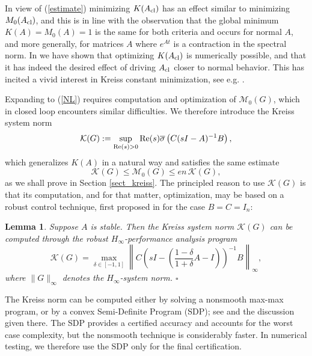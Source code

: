 \documentclass[12pt, a4paper,reqno]{amsart}
\newtheorem{lemma}{\bf Lemma}
\theoremstyle{definition}
\begin{document}
In view of (\ref{estimate}) minimizing $K(A_{\rm cl})$ has an  effect similar to minimizing $M_0(A_{\rm cl})$, and this is in line with the observation
that the global minimum $K(A)=M_0(A)=1$  is the same for both criteria and occurs for normal $A$, 
and more generally, for matrices $A$ where $e^{At}$ is a
contraction in the spectral norm. In \cite{an_kreiss} we have shown that optimizing $K(A_{\rm cl})$ is numerically possible, and that
it has indeed the desired effect of driving $A_{\rm cl}$ closer to normal behavior.
This has incited a vivid interest in Kreiss constant minimization, see e.g.
\cite{Krakovska2024Resilience,LeeMarcus2023JFM,ShcherbakovDabbene2022EJC,GarciaHilares2023PhD,Lee2024Thesis,DudarenkoEtAl2023IA}.


Expanding to (\ref{NL}) requires
computation and
optimization of $\mathcal M_0(G)$, which in closed loop encounters similar difficulties. We therefore
introduce the Kreiss system norm
$$
\mathcal K(G) := \sup_{{\rm Re}(s) > 0} {\rm Re}(s) \overline{\sigma} \left( C (sI-A)^{-1} B\right),
$$
which generalizes $K(A)$ in a natural way and satisfies the same estimate
\begin{equation}
\mathcal K(G) \leq \mathcal M_0(G) \leq en\, \mathcal K(G),
\end{equation}
as we shall prove in Section \ref{sect_kreiss}.  The principled reason to use $\mathcal K(G)$
is that its computation, and for that matter, optimization, may be based on a robust control technique, first proposed in  \cite[Thm. 2.1]{an_kreiss}
for the case $B=C=I_n$:
\begin{lemma}
\label{theorem1}
Suppose $A$ is stable. Then
the Kreiss system norm $\mathcal K(G)$ can be computed through the robust $H_\infty$-performance analysis program
\begin{equation}
\label{parametric}
\mathcal K(G) = \max_{\delta \in [-1,1]} \left\| C\left(sI-\left(\textstyle\frac{1-\delta}{1+\delta} A-I\right)\right)^{-1}B\right\|_\infty,
\end{equation}
where $\|G\|_\infty$ denotes the $H_\infty$-system norm.
\hfill $\square$
\end{lemma}



The Kreiss  norm can be computed either by solving a nonsmooth max-max program, or 
by a convex Semi-Definite Program  (SDP);  see \cite[Theorems 2.1 and 2.4]{an_kreiss}  and the discussion given there. The SDP provides a certified accuracy
and accounts for the worst case complexity, 
but the nonsmooth technique is considerably faster. In numerical testing, we 
therefore use the SDP only for the final certification. 
 
\end{document}
